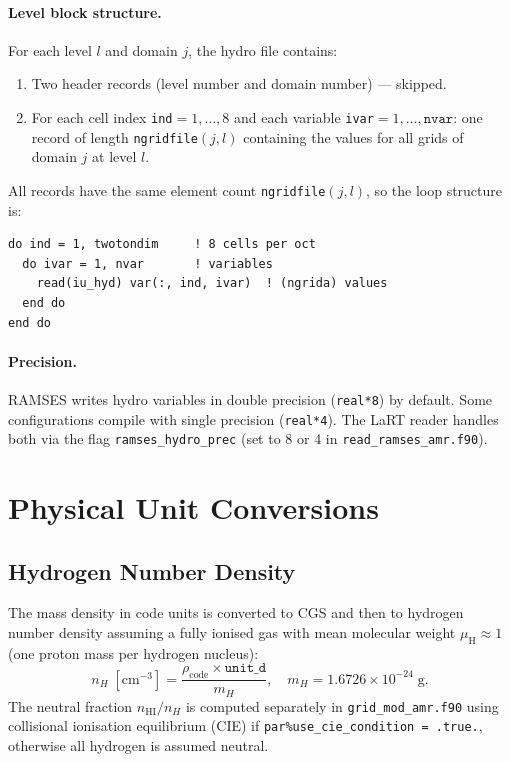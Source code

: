 \documentclass[english,a4paper]{my_memo}
\begin{document}
\paragraph{Level block structure.}
For each level $l$ and domain $j$, the hydro file contains:
\begin{enumerate}
  \item Two header records (level number and domain number) — skipped.
  \item For each cell index \texttt{ind}$=1,\ldots,8$ and each variable
        \texttt{ivar}$=1,\ldots,\texttt{nvar}$: one record of length
        \texttt{ngridfile}$(j,l)$ containing the values for all grids of
        domain $j$ at level $l$.
\end{enumerate}
All records have the same element count \texttt{ngridfile}$(j,l)$, so the
loop structure is:

\begin{lstlisting}
do ind = 1, twotondim     ! 8 cells per oct
  do ivar = 1, nvar       ! variables
    read(iu_hyd) var(:, ind, ivar)  ! (ngrida) values
  end do
end do
\end{lstlisting}

\paragraph{Precision.}
RAMSES writes hydro variables in double precision (\texttt{real*8}) by
default.  Some configurations compile with single precision (\texttt{real*4}).
The LaRT reader handles both via the flag \texttt{ramses\_hydro\_prec}
(set to 8 or 4 in \texttt{read\_ramses\_amr.f90}).

\section{Physical Unit Conversions}

\subsection{Hydrogen Number Density}

The mass density in code units is converted to CGS and then to hydrogen
number density assuming a fully ionised gas with mean molecular weight
$\mu_\mathrm{H} \approx 1$ (one proton mass per hydrogen nucleus):
\begin{equation}
  n_H \;[\mathrm{cm}^{-3}]
  = \frac{\rho_\mathrm{code} \times \texttt{unit\_d}}{m_H},
  \quad m_H = 1.6726 \times 10^{-24}\;\mathrm{g}.
\end{equation}
The neutral fraction $n_\mathrm{HI}/n_H$ is computed separately in
\texttt{grid\_mod\_amr.f90} using collisional ionisation equilibrium (CIE) if
\texttt{par\%use\_cie\_condition = .true.}, otherwise all hydrogen is assumed
neutral.
\end{document}
